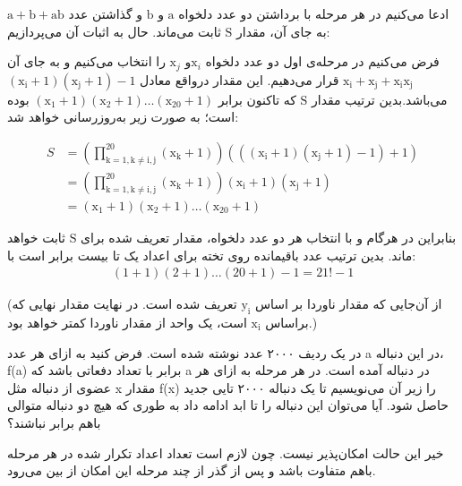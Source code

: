 \documentclass[11pt,largemargins]{h2wp}
\begin{document}
    
    ادعا می‌کنیم در هر مرحله با برداشتن دو عدد دلخواه
    $ \mathrm{a}$
    و
    $ \mathrm{b}$
    و گذاشتن عدد
    $\mathrm{a + b + ab}$
    به جای آن، مقدار
    $\mathrm{S}$
    ثابت می‌ماند. حال به اثبات آن می‌پردازیم:
    
    
      
    فرض می‌کنیم در مرحله‌‌ی اول دو عدد دلخواه
    $\mathrm{x}_{i}$و $\mathrm{x}_{j}$
    را انتخاب می‌کنیم و به جای آن
    $\mathrm{{x}_{i}+{x}_{j}+ {x}_{i}{x}_{j}}$
    قرار می‌دهیم. این مقدار درواقع معادل
    $\mathrm{({x}_{i} + 1)({x}_{j} + 1) - 1}$
    می‌باشد.بدین ترتیب مقدار
    $\mathrm{S}$
    که تاکنون برابر
    $\mathrm{({x}_1 + 1)({x}_2 + 1)\ldots({x}_{20} + 1)}$
    بوده است؛ به صورت زیر به‌روزرسانی خواهد شد:
    
    \begin{align} \nonumber
        S &= \mathrm{(\prod_{k=1,k\neq i,j}^{20} ({x}_k + 1))((({x}_i + 1)({x}_j + 1)-1)+1)} \\ \nonumber
        & = \mathrm{(\prod_{k=1,k\neq i,j}^{20} ({x}_k + 1))({x}_i + 1)({x}_j + 1)}\\ \nonumber
        & =\mathrm{ ({x}_1 + 1)({x}_2 + 1)\ldots({x}_{20} + 1)}    \nonumber 
    \end{align} 
    
       
    بنابراین در هرگام و با انتخاب هر دو عدد دلخواه، مقدار تعریف شده برای
    $\mathrm{S}$
    ثابت خواهد ماند. بدین ترتیب عدد باقیمانده روی تخته برای اعداد یک تا بیست برابر است با:
    \begin{align} \nonumber
        \mathrm{(1 + 1)(2 + 1)\ldots(20 + 1) - 1= 21!-1}  \nonumber     
    \end{align}
    
    
    (از آن‌جایی که مقدار ناوردا بر اساس 
    $\mathrm{{y}_i}$
    تعریف شده است. در نهایت مقدار نهایی که براساس
    $\mathrm{{x}_i}$
    است، یک واحد از مقدار ناوردا کمتر خواهد بود.)
    
    
    
    \question
    
    
    در یک ردیف ۲۰۰۰ عدد نوشته شده است. فرض کنید به ازای هر عدد a در این دنباله، f(a) برابر با تعداد دفعاتی باشد که a در دنباله آمده است. در هر مرحله به ازای هر عضوی از دنباله مثل x مقدار f(x) را زیر آن می‌نویسیم تا یک دنباله ۲۰۰۰ تایی جدید حاصل شود. آیا می‌توان این دنباله را تا ابد ادامه داد به ‌طوری که هیچ دو دنباله متوالی باهم برابر نباشند؟
    
    
    \solution
    خیر این حالت امکان‌پذیر نیست. چون لازم است تعداد اعداد تکرار شده در هر مرحله باهم متفاوت باشد و پس از گذر از چند مرحله این امکان از بین می‌رود.
   
\end{document}
